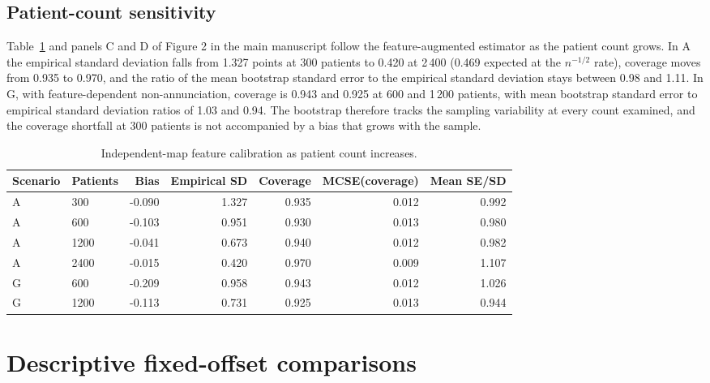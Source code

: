 \documentclass[11pt,letterpaper]{article}
\begin{document}
\subsection{Patient-count sensitivity}
Table~\ref{stab:simsweep} and panels C and D of Figure 2 in the main manuscript follow the feature-augmented estimator as the patient count grows. In A the empirical standard deviation falls from 1.327 points at 300 patients to 0.420 at 2\,400 (0.469 expected at the $n^{-1/2}$ rate), coverage moves from 0.935 to 0.970, and the ratio of the mean bootstrap standard error to the empirical standard deviation stays between 0.98 and 1.11. In G, with feature-dependent non-annunciation, coverage is 0.943 and 0.925 at 600 and 1\,200 patients, with mean bootstrap standard error to empirical standard deviation ratios of 1.03 and 0.94. The bootstrap therefore tracks the sampling variability at every count examined, and the coverage shortfall at 300 patients is not accompanied by a bias that grows with the sample.
\begin{table}[htbp]\centering\small
\caption{Independent-map feature calibration as patient count increases.}\label{stab:simsweep}
\begin{tabular}{@{}llrrrrr@{}}\toprule
Scenario & Patients & Bias & Empirical SD & Coverage & MCSE(coverage) & Mean SE/SD\\\midrule
A & 300 & -0.090 & 1.327 & 0.935 & 0.012 & 0.992\\
A & 600 & -0.103 & 0.951 & 0.930 & 0.013 & 0.980\\
A & 1200 & -0.041 & 0.673 & 0.940 & 0.012 & 0.982\\
A & 2400 & -0.015 & 0.420 & 0.970 & 0.009 & 1.107\\
G & 600 & -0.209 & 0.958 & 0.943 & 0.012 & 1.026\\
G & 1200 & -0.113 & 0.731 & 0.925 & 0.013 & 0.944\\
\bottomrule\end{tabular}
\end{table}



\section{Descriptive fixed-offset comparisons}\label{s:level}
\end{document}
